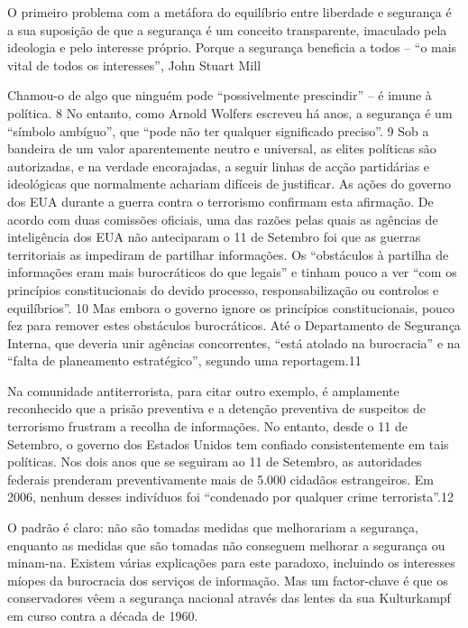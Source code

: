  \par 
O primeiro problema com a metáfora do equilíbrio entre liberdade e segurança é a sua suposição de que a segurança é um conceito transparente, imaculado pela ideologia e pelo interesse próprio. Porque a segurança beneficia a todos – “o mais vital de todos os interesses”, John Stuart Mill
 \par 
Chamou-o de algo que ninguém pode “possivelmente prescindir” – é imune à política. {\color{blue}8} No entanto, como Arnold Wolfers escreveu há anos, a segurança é um “símbolo ambíguo”, que “pode não ter qualquer significado preciso”. {\color{blue}9} Sob a bandeira de um valor aparentemente neutro e universal, as elites políticas são autorizadas, e na verdade encorajadas, a seguir linhas de acção partidárias e ideológicas que normalmente achariam difíceis de justificar. As ações do governo dos EUA durante a guerra contra o terrorismo confirmam esta afirmação. De acordo com duas comissões oficiais, uma das razões pelas quais as agências de inteligência dos EUA não anteciparam o {\color{blue}11} de Setembro foi que as guerras territoriais as impediram de partilhar informações. Os “obstáculos à partilha de informações eram mais burocráticos do que legais” e tinham pouco a ver “com os princípios constitucionais do devido processo, responsabilização ou controlos e equilíbrios”. {\color{blue}10} Mas embora o governo ignore os princípios constitucionais, pouco fez para remover estes obstáculos burocráticos. Até o Departamento de Segurança Interna, que deveria unir agências concorrentes, “está atolado na burocracia” e na “falta de planeamento estratégico”, segundo uma reportagem.{\color{blue}11}
 \par 
Na comunidade antiterrorista, para citar outro exemplo, é amplamente reconhecido que a prisão preventiva e a detenção preventiva de suspeitos de terrorismo frustram a recolha de informações. No entanto, desde o {\color{blue}11} de Setembro, o governo dos Estados Unidos tem confiado consistentemente em tais políticas. Nos dois anos que se seguiram ao {\color{blue}11} de Setembro, as autoridades federais prenderam preventivamente mais de {\color{blue}5}.{\color{blue}000} cidadãos estrangeiros. Em 2006, nenhum desses indivíduos foi “condenado por qualquer crime terrorista”.{\color{blue}12}
 \par 
O padrão é claro: não são tomadas medidas que melhorariam a segurança, enquanto as medidas que são tomadas não conseguem melhorar a segurança ou minam-na. Existem várias explicações para este paradoxo, incluindo os interesses míopes da burocracia dos serviços de informação. Mas um factor-chave é que os conservadores vêem a segurança nacional através das lentes da sua Kulturkampf em curso contra a década de 1960.
